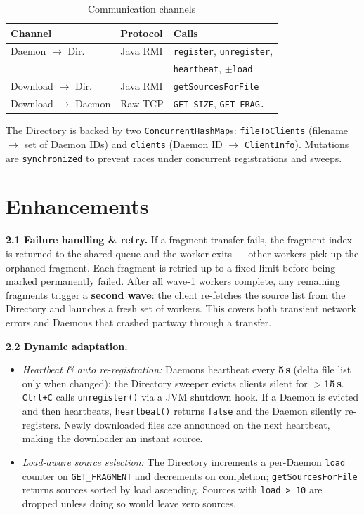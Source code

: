 \documentclass[10pt,twocolumn,a4paper]{article}
\begin{document}
\begin{table}[H]
\centering
\caption{Communication channels}
\scriptsize
\begin{tabular}{@{}lll@{}}
\toprule
\textbf{Channel} & \textbf{Protocol} & \textbf{Calls} \\
\midrule
Daemon $\to$ Dir. & Java RMI & \texttt{register}, \texttt{unregister}, \\
 & & \texttt{heartbeat}, $\pm$\texttt{load} \\
Download $\to$ Dir. & Java RMI & \texttt{getSourcesForFile} \\
Download $\to$ Daemon & Raw TCP & \texttt{GET\_SIZE}, \texttt{GET\_FRAG.} \\
\bottomrule
\end{tabular}
\end{table}

The Directory is backed by two \texttt{ConcurrentHashMap}s: \texttt{fileToClients} (filename $\to$ set of Daemon IDs) and \texttt{clients} (Daemon ID $\to$ \texttt{ClientInfo}). Mutations are \texttt{synchronized} to prevent races under concurrent registrations and sweeps.

\section{Enhancements}

\textbf{2.1 Failure handling \& retry.}
If a fragment transfer fails, the fragment index is returned to the shared queue and the worker exits --- other workers pick up the orphaned fragment. Each fragment is retried up to a fixed limit before being marked permanently failed. After all wave-1 workers complete, any remaining fragments trigger a \textbf{second wave}: the client re-fetches the source list from the Directory and launches a fresh set of workers. This covers both transient network errors and Daemons that crashed partway through a transfer.

\textbf{2.2 Dynamic adaptation.}
\begin{itemize}[nosep,leftmargin=1.5em]
  \item \textit{Heartbeat \& auto re-registration:} Daemons heartbeat every \textbf{5\,s} (delta file list only when changed); the Directory sweeper evicts clients silent for $>$\textbf{15\,s}. \texttt{Ctrl+C} calls \texttt{unregister()} via a JVM shutdown hook. If a Daemon is evicted and then heartbeats, \texttt{heartbeat()} returns \texttt{false} and the Daemon silently re-registers. Newly downloaded files are announced on the next heartbeat, making the downloader an instant source.
  \item \textit{Load-aware source selection:} The Directory increments a per-Daemon \texttt{load} counter on \texttt{GET\_FRAGMENT} and decrements on completion; \texttt{getSourcesForFile} returns sources sorted by load ascending. Sources with \texttt{load > 10} are dropped unless doing so would leave zero sources.
\end{itemize}
\end{document}
